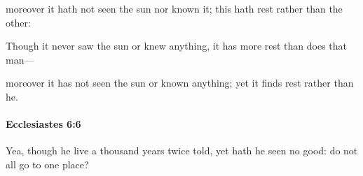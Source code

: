 			\begin{versebox}
					\item[BHS] 
					\item[LXX] 
					\item[ASV] moreover it hath not seen the sun nor known it; this hath rest rather than the other:
					\item[NIV] Though it never saw the sun or knew anything, it has more rest than does that man—
					\item[NRSV] moreover it has not seen the sun or known anything; yet it finds rest rather than he.
			\end{versebox}

		\paragraph{Ecclesiastes 6:6} %
			\label{ECCLESIASTES-6-6}

			Yea, though he live a thousand years twice told, yet hath he seen no good: do not all go to one place?

